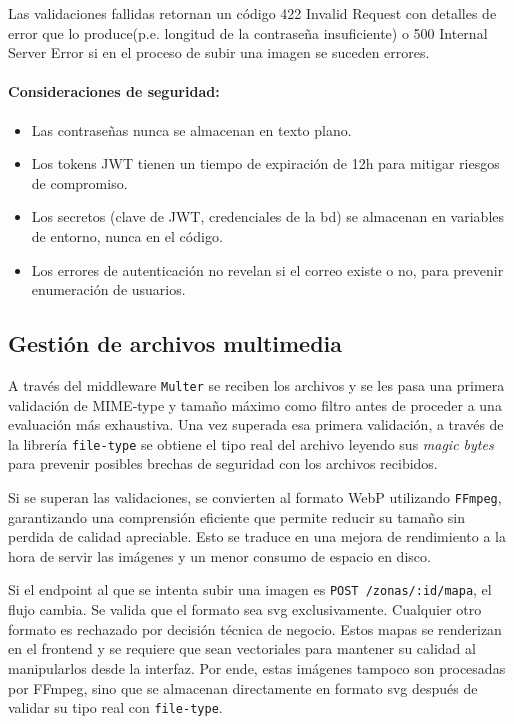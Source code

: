 Las validaciones fallidas retornan un código 422 Invalid Request con detalles de error que lo produce(p.e. longitud de la contraseña insuficiente) o 500 Internal Server Error si en el proceso de subir una imagen se suceden errores.

\paragraph{Consideraciones de seguridad:}

\begin{itemize}
  \item Las contraseñas nunca se almacenan en texto plano.
  \item Los tokens JWT tienen un tiempo de expiración de 12h para mitigar riesgos de compromiso.
  \item Los secretos (clave de JWT, credenciales de la bd) se almacenan en variables de entorno, nunca en el código.
  \item Los errores de autenticación no revelan si el correo existe o no, para prevenir enumeración de usuarios.
\end{itemize}

\subsection{Gestión de archivos multimedia}

A través del middleware \texttt{Multer} se reciben los archivos y se les pasa una primera validación de MIME-type y tamaño máximo como filtro antes de proceder a una evaluación más exhaustiva. Una vez superada esa primera validación, a través de la librería \texttt{file-type} se obtiene el tipo real del archivo leyendo sus \textit{magic bytes} para prevenir posibles brechas de seguridad con los archivos recibidos. 

Si se superan las validaciones, se convierten al formato WebP utilizando \texttt{FFmpeg}, garantizando una comprensión eficiente que permite reducir su tamaño sin perdida de calidad apreciable. Esto se traduce en una mejora de rendimiento a la hora de servir las imágenes y un menor consumo de espacio en disco.

Si el endpoint al que se intenta subir una imagen es \texttt{POST /zonas/:id/mapa}, el flujo cambia. Se valida que el formato sea svg exclusivamente. Cualquier otro formato es rechazado por decisión técnica de negocio. Estos mapas se renderizan en el frontend y se requiere que sean vectoriales para mantener su calidad al manipularlos desde la interfaz. Por ende, estas imágenes tampoco son procesadas por FFmpeg, sino que se almacenan directamente en formato svg después de validar su tipo real con \texttt{file-type}.


